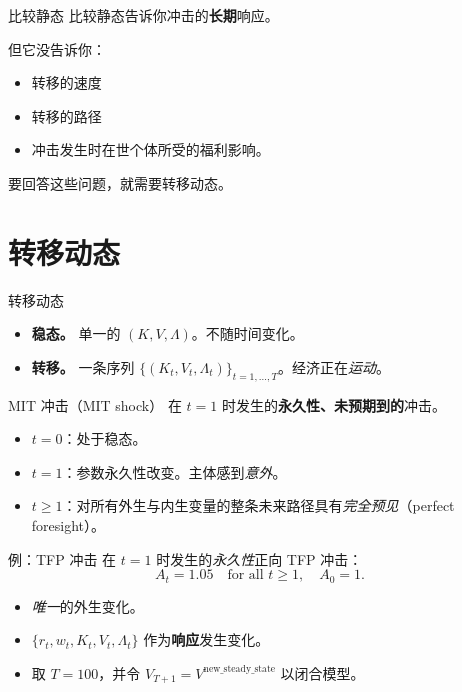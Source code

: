 \documentclass[10pt,aspectratio=169]{beamer}
\begin{document}
\begin{frame}{比较静态}
  比较静态告诉你冲击的\textbf{长期}响应。

  但它没告诉你：
  \begin{itemize}
    \item 转移的速度
    \item 转移的路径
    \item 冲击发生时在世个体所受的福利影响。
  \end{itemize}

  要回答这些问题，就需要转移动态。
\end{frame}

\section[转移动态]{转移动态}

\begin{frame}{转移动态}
  \begin{itemize}
    \item \textbf{稳态。} 单一的 $(K, V, \Lambda)$。不随时间变化。
    \item \textbf{转移。} 一条序列 $\{(K_t, V_t, \Lambda_t)\}_{t = 1,\dots,T}$。经济正在\emph{运动}。
  \end{itemize}
\end{frame}

\begin{frame}{MIT 冲击（MIT shock）}
  在 $t = 1$ 时发生的\textbf{永久性、未预期到的}冲击。
  \begin{itemize}
    \item $t = 0$：处于稳态。
    \item $t = 1$：参数永久性改变。主体感到\emph{意外}。
    \item $t \geq 1$：对所有外生与内生变量的整条未来路径具有\emph{完全预见}（perfect foresight）。
  \end{itemize}
\end{frame}

\begin{frame}{例：TFP 冲击}
  在 $t = 1$ 时发生的\emph{永久性}正向 TFP 冲击：
  \[
    A_t = 1.05 \quad \text{for all } t \geq 1, \quad A_0 = 1.
  \]
  \begin{itemize}
    \item \emph{唯一}的外生变化。
    \item $\{r_t, w_t, K_t, V_t, \Lambda_t\}$ 作为\textbf{响应}发生变化。
    \item 取 $T = 100$，并令 $V_{T+1} = V^\text{new\_steady\_state}$ 以闭合模型。
  \end{itemize}
\end{frame}
\end{document}
